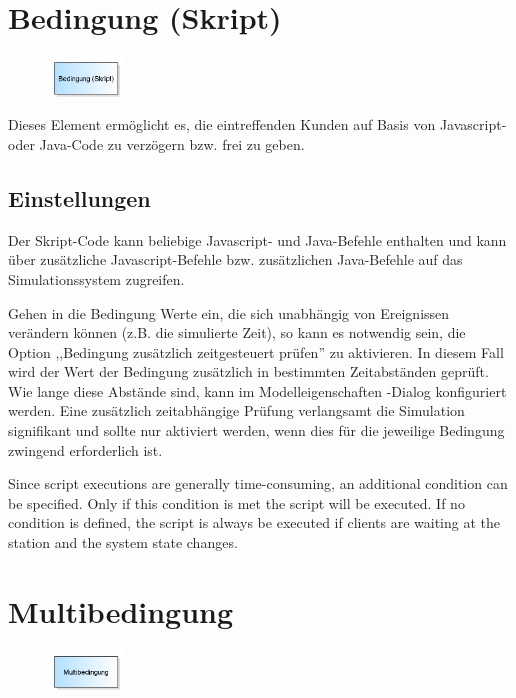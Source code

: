 \section{Bedingung (Skript)}
\label{ref:ModelElementHoldJS}

\begin{figure}
\vspace{-22pt}
\includegraphics[width=2cm]{imageModelElementHoldJS.png}
\vspace{-22pt}
\end{figure}

Dieses Element ermöglicht es, die eintreffenden Kunden auf Basis von Javascript-
oder Java-Code zu verzögern bzw. frei zu geben.

\subsection*{Einstellungen}

Der Skript-Code kann beliebige Javascript- und Java-Befehle enthalten und kann über
zusätzliche Javascript-Befehle bzw. zusätzlichen Java-Befehle 
auf das Simulationssystem zugreifen.

Gehen in die Bedingung Werte ein, die sich unabhängig von Ereignissen verändern können (z.B. die simulierte Zeit), so kann es notwendig sein,
die Option ,,Bedingung zusätzlich zeitgesteuert prüfen'' zu aktivieren. In diesem Fall wird der Wert der Bedingung zusätzlich in bestimmten
Zeitabständen geprüft. Wie lange diese Abstände sind, kann im Modelleigenschaften -Dialog konfiguriert
werden. Eine zusätzlich zeitabhängige Prüfung verlangsamt die Simulation signifikant und sollte nur aktiviert werden, wenn dies für die
jeweilige Bedingung zwingend erforderlich ist.

Since script executions are generally time-consuming, an additional condition can be specified.
Only if this condition is met the script will be executed. If no condition is defined, the script
is always be executed if clients are waiting at the station and the system state changes.


\section{Multibedingung}
\label{ref:ModelElementHoldMulti}

\begin{figure}
\vspace{-22pt}
\includegraphics[width=2cm]{imageModelElementHoldMulti.png}
\vspace{-22pt}
\end{figure}

